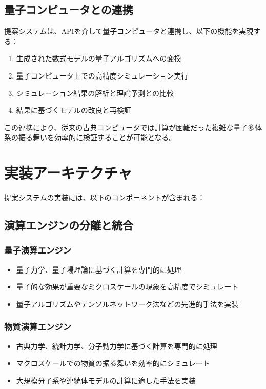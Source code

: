 \documentclass[12pt,a4paper]{article}
\begin{document}
\subsection{量子コンピュータとの連携}

提案システムは、APIを介して量子コンピュータと連携し、以下の機能を実現する：

\begin{enumerate}
\item 生成された数式モデルの量子アルゴリズムへの変換
\item 量子コンピュータ上での高精度シミュレーション実行
\item シミュレーション結果の解析と理論予測との比較
\item 結果に基づくモデルの改良と再検証
\end{enumerate}

この連携により、従来の古典コンピュータでは計算が困難だった複雑な量子多体系の振る舞いを効率的に検証することが可能となる。

\section{実装アーキテクチャ}

提案システムの実装には、以下のコンポーネントが含まれる：

\subsection{演算エンジンの分離と統合}

\subsubsection{量子演算エンジン}
\begin{itemize}
\item 量子力学、量子場理論に基づく計算を専門的に処理
\item 量子的な効果が重要なミクロスケールの現象を高精度でシミュレート
\item 量子アルゴリズムやテンソルネットワーク法などの先進的手法を実装
\end{itemize}

\subsubsection{物質演算エンジン}
\begin{itemize}
\item 古典力学、統計力学、分子動力学に基づく計算を専門的に処理
\item マクロスケールでの物質の振る舞いを効率的にシミュレート
\item 大規模分子系や連続体モデルの計算に適した手法を実装
\end{itemize}
\end{document}

